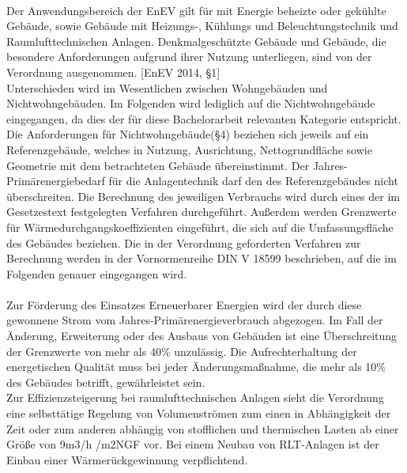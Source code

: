 \\
Der Anwendungsbereich der EnEV gilt für mit Energie beheizte oder gekühlte Gebäude, sowie Gebäude mit Heizungs-, Kühlungs und Beleuchtungstechnik und Raumlufttechnischen Anlagen. Denkmalgeschützte Gebäude und Gebäude, die besondere Anforderungen aufgrund ihrer Nutzung unterliegen, sind von der Verordnung ausgenommen. [EnEV 2014, §1]\\
Unterschieden wird im Wesentlichen zwischen Wohngebäuden und Nichtwohngebäuden. Im Folgenden wird lediglich auf die Nichtwohngebäude eingegangen, da dies der für diese Bachelorarbeit relevanten Kategorie entspricht.\\
Die Anforderungen für Nichtwohngebäude(§4) beziehen sich jeweils auf ein Referenzgebäude, welches in Nutzung, Ausrichtung, Nettogrundfläche sowie Geometrie mit dem betrachteten Gebäude übereinstimmt. Der Jahres-Primärenergiebedarf für die Anlagentechnik darf den des Referenzgebäudes nicht überschreiten. Die Berechnung des jeweiligen Verbrauchs wird durch eines der im Gesetzestext festgelegten Verfahren durchgeführt. Außerdem werden Grenzwerte für Wärmedurchgangskoeffizienten eingeführt, die sich auf die Umfassungsfläche des Gebäudes beziehen. Die in der Verordnung geforderten Verfahren zur Berechnung werden in der Vornormenreihe DIN V 18599 beschrieben, auf die im Folgenden genauer eingegangen wird.  \\
\\
Zur Förderung des Einsatzes Erneuerbarer Energien wird der durch diese gewonnene Strom vom Jahres-Primärenergieverbrauch abgezogen. Im Fall der Änderung, Erweiterung oder des Ausbaus von Gebäuden ist  eine Überschreitung der Grenzwerte von mehr als 40\% unzulässig. Die Aufrechterhaltung der energetischen Qualität muss bei jeder Änderungsmaßnahme, die mehr als 10\% des Gebäudes betrifft, gewährleistet sein.\\
Zur Effizienzsteigerung bei raumlufttechnischen Anlagen sieht die Verordnung eine selbsttätige Regelung von Volumenströmen zum einen in Abhängigkeit der Zeit oder zum anderen abhängig von stofflichen und thermischen Lasten ab einer Größe von 9m3/h /m2NGF vor. Bei einem Neubau von RLT-Anlagen ist der Einbau einer Wärmerückgewinnung verpflichtend. \\
\\ 
